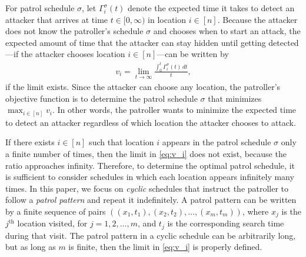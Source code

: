 \documentclass[11pt,a4paper]{article}
\begin{document}
For patrol schedule $\sigma$, let $\Gamma^\sigma_i(t)$ denote the expected time it takes to detect an attacker that arrives at time $t \in[0, \infty)$ in location $i \in [n]$.
Because the attacker does not know the patroller's schedule $\sigma$ and chooses when to start an attack, the expected amount of time that the attacker can stay hidden until getting detected---if the attacker chooses location $i \in [n]$---can be written by 
\begin{align}
v_i = \lim_{t \rightarrow \infty} \frac{\int_0^t \Gamma_i^\sigma (t) \, dt}{t},
\label{eq:v_i}
\end{align}
if the limit exists.
Since the attacker can choose any location, the patroller's objective function is to determine the patrol schedule $\sigma$ that minimizes
$\max_{i \in [n]} v_i$.
In other words, the patroller wants to minimize the expected time to detect an attacker regardless of which location the attacker chooses to attack.


If there exists $i \in [n]$ such that location $i$ appears in the patrol schedule $\sigma$ only a finite number of times, then the limit in \eqref{eq:v_i} does not exist, because the ratio approaches infinity.
Therefore, to determine the optimal patrol schedule, it is sufficient to consider schedules in which each location appears infinitely many times.
In this paper, we focus on \textit{cyclic} schedules that instruct the patroller to follow a \textit{patrol pattern} and repeat it indefinitely.
A patrol pattern can be written by a finite sequence of pairs  $((x_1,t_1),(x_2,t_2), \ldots, (x_m, t_m))$, where $x_j$ is the $j^{\text{th}}$ location visited, for $j=1,2,\ldots,m$, and $t_j$ is the corresponding search time during that visit.
The patrol pattern in a cyclic schedule can be arbitrarily long, but as long as $m$ is finite, then the limit in \eqref{eq:v_i} is properly defined.


\end{document}
